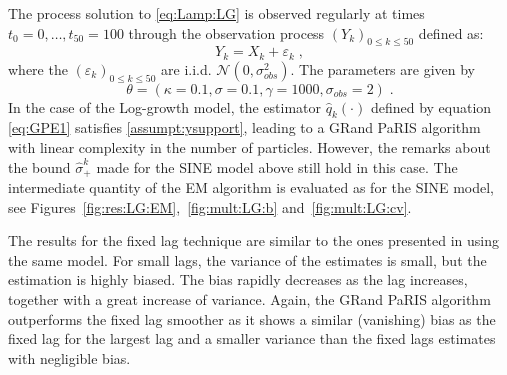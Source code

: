 \documentclass[12pt]{article}
\newcommand{\eqsp}{\;}
\newcommand{\1}{\mathrm{1}}
\begin{document}
The process solution to \eqref{eq:Lamp:LG} is observed regularly at times $t_0=0,\dots,t_{50}=100$ through the observation process $(Y_k)_{0\le k\le 50}$ defined as:
\begin{equation*}
Y_k = X_k + \varepsilon_k\eqsp,
\end{equation*}
where the $(\varepsilon_k)_{0\le k \le 50}$ are i.i.d. $ \mathcal{N}(0,\sigma^2_{obs})$.
The parameters are given by $$\theta =(\kappa=0.1,\sigma=0.1,\gamma=1000,\sigma_{obs} = 2)\eqsp.$$
In the case of the Log-growth model, the estimator $\widehat{q}_k(\cdot)$ defined by equation \eqref{eq:GPE1} satisfies \eqref{assumpt:ysupport}, leading to a GRand PaRIS algorithm with linear complexity in the number of particles. However, the remarks about the bound $\widehat{\sigma}_+^k$
 made for the SINE model above still hold in this case.  
The intermediate quantity of the EM algorithm is evaluated  as for the SINE model, see Figures~\ref{fig:res:LG:EM},~\ref{fig:mult:LG:b} and~\ref{fig:mult:LG:cv}.

The results for the fixed lag technique are similar to the ones presented in \cite[Figure 1]{olsson:strojby:2011} using the same model. 
For small lags, the variance of the estimates is small, but the estimation is highly biased. 
The bias rapidly decreases as the lag increases, together with a  great increase of variance.  
Again, the GRand PaRIS algorithm outperforms the fixed lag smoother as it shows  a similar (vanishing) bias as the fixed lag for the largest lag and a smaller variance than the fixed lags estimates with negligible bias. 
\end{document}
